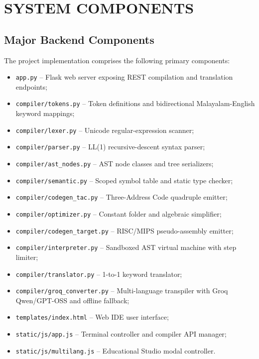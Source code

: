 \documentclass[12pt,a4paper]{report}
\begin{document}
\newpage
\appendix
\chapter{SYSTEM COMPONENTS}

\section{Major Backend Components}
The project implementation comprises the following primary components:
\begin{itemize}
    \item \texttt{app.py} -- Flask web server exposing REST compilation and translation endpoints;
    \item \texttt{compiler/tokens.py} -- Token definitions and bidirectional Malayalam-English keyword mappings;
    \item \texttt{compiler/lexer.py} -- Unicode regular-expression scanner;
    \item \texttt{compiler/parser.py} -- LL(1) recursive-descent syntax parser;
    \item \texttt{compiler/ast\_nodes.py} -- AST node classes and tree serializers;
    \item \texttt{compiler/semantic.py} -- Scoped symbol table and static type checker;
    \item \texttt{compiler/codegen\_tac.py} -- Three-Address Code quadruple emitter;
    \item \texttt{compiler/optimizer.py} -- Constant folder and algebraic simplifier;
    \item \texttt{compiler/codegen\_target.py} -- RISC/MIPS pseudo-assembly emitter;
    \item \texttt{compiler/interpreter.py} -- Sandboxed AST virtual machine with step limiter;
    \item \texttt{compiler/translator.py} -- 1-to-1 keyword translator;
    \item \texttt{compiler/groq\_converter.py} -- Multi-language transpiler with Groq Qwen/GPT-OSS and offline fallback;
    \item \texttt{templates/index.html} -- Web IDE user interface;
    \item \texttt{static/js/app.js} -- Terminal controller and compiler API manager;
    \item \texttt{static/js/multilang.js} -- Educational Studio modal controller.
\end{itemize}
\end{document}
